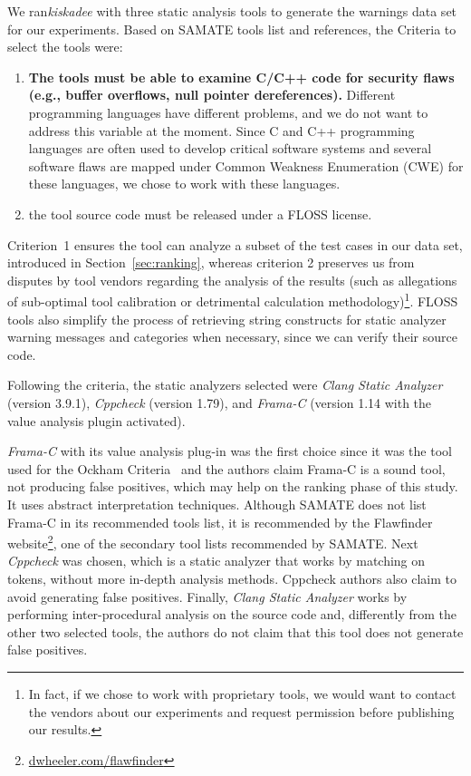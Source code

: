 We ran\textit{kiskadee} with three static analysis tools to generate the
warnings data set for our experiments. Based on SAMATE tools list and
references, the Criteria to select the tools were:
\begin{enumerate}
  \item \textbf{The tools must be able to examine C/C++ code for security flaws (e.g., buffer overflows, null pointer dereferences).} Different programming languages have different problems, and we do not want to address this variable at the moment. Since C and C++ programming languages are often used to develop critical software systems and several software flaws are mapped under Common Weakness Enumeration (CWE) for these languages, we chose to work with these languages.
  \item the tool source code must be released under a FLOSS license.
\end{enumerate}
Criterion~1 ensures the tool can analyze a subset of the test cases in our data
set, introduced in Section~\ref{sec:ranking}, whereas criterion 2 preserves us
from disputes by tool vendors regarding the analysis of the results (such as
allegations of sub-optimal tool calibration or detrimental calculation
methodology)\footnote{In fact, if we chose
to work with
proprietary tools, we would want to contact the vendors about our experiments
and request permission before publishing our results.}. FLOSS tools also simplify the process of retrieving string
constructs for static analyzer warning messages and categories when necessary,
since we can verify their source code.

Following the criteria, the static
analyzers selected were \emph{Clang Static Analyzer} (version 3.9.1),
\emph{Cppcheck} (version 1.79), and \emph{Frama-C} (version 1.14 with the value
analysis plugin activated).

\textit{Frama-C} with its value analysis plug-in was the first choice since it
was the tool used for the Ockham Criteria~\cite{black_sate_2016} and the
authors claim Frama-C is a sound tool, not producing false positives, which may
help on the ranking phase of this study. It uses abstract interpretation
techniques. Although SAMATE does not list Frama-C in its recommended tools list, it
is recommended by the Flawfinder
website\footnote{\url{dwheeler.com/flawfinder}}, one of the secondary tool
lists recommended by SAMATE. Next \textit{Cppcheck} was chosen, which is a
static analyzer that works by matching on tokens, without more in-depth analysis
methods. Cppcheck authors also claim to avoid generating false positives.
Finally, \textit{Clang Static Analyzer} works by performing inter-procedural
analysis on the source code and, differently from the other two selected tools,
the authors do not claim that this tool does not generate false positives.

